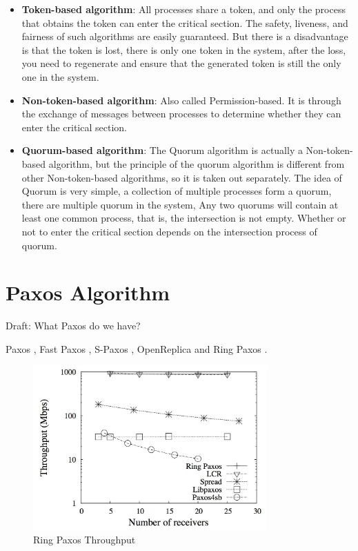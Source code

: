 \documentclass[12pt, a4paper]{article}
\begin{document}
\begin{itemize}
  \item \textbf{Token-based algorithm}: All processes share a token, and only the 
  process that obtains the token can enter the critical section. The safety, 
  liveness, and fairness of such algorithms are easily guaranteed. But there is 
  a disadvantage is that the token is lost, there is only one token in the 
  system, after the loss, you need to regenerate and ensure that the generated 
  token is still the only one in the system. 
  \item \textbf{Non-token-based algorithm}: Also called Permission-based. It is 
  through the exchange of messages between processes to determine whether they 
  can enter the critical section. 
  \item \textbf{Quorum-based algorithm}: The Quorum algorithm is actually a 
  Non-token-based algorithm, but the principle of the quorum algorithm is 
  different from other Non-token-based algorithms, so it is taken out 
  separately. The idea of Quorum is very simple, a collection of multiple 
  processes form a quorum, there are multiple quorum in the system, Any two 
  quorums will contain at least one common process, that is, the intersection 
  is not empty. Whether or not to enter the critical section depends on the 
  intersection process of quorum. 
\end{itemize}



\section{Paxos Algorithm} \label{sec:paxos}

Draft: What Paxos do we have?

Paxos \cite{lamport2001paxos}, Fast Paxos \cite{fastpaxos}, 
S-Paxos \cite{spaxos}, 
OpenReplica \cite{openreplica} and Ring Paxos \cite{ringpaxos}.

\begin{figure}[htp]
  \centering
  \includegraphics[width=0.8\textwidth]{img/RingPaxosThroughput.jpg}
  \caption{Ring Paxos Throughput}
  \label{fig:RingPaxosThroughput}
\end{figure}
\end{document}
